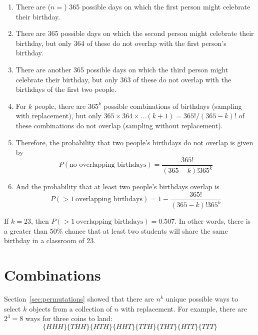 \begin{enumerate}
\item There are ($n=$) 365 possible days on which the first person might
  celebrate their birthday.
\item There are 365 possible days on which the second person might
  celebrate their birthday, but only 364 of these do not overlap with
  the first person's birthday.
\item There are another 365 possible days on which the third person
  might celebrate their birthday, but only 363 of these do not overlap
  with the birthdays of the first two people.
\item For $k$ people, there are $365^k$ possible combinations of
  birthdays (sampling with replacement), but only
  $365\times{364}\times{\ldots}(k+1) = 365!/(365-k)!$ of these combinations
  do not overlap (sampling without replacement).
\item Therefore, the probability that two people's birthdays do
  not overlap is given by
  \[
  P(\mbox{no overlapping birthdays}) = \frac{365!}{(365-k)!365^k}
  \]
\item And the probability that at least two people's birthdays
  overlap is
  \[
  P(>1~\mbox{overlapping birthdays}) = 1 - \frac{365!}{(365-k)!365^k}
  \]  
\end{enumerate}

If $k = 23$, then $P(>1~\mbox{overlapping birthdays}) = 0.507$. In
other words, there is a greater than 50\% chance that at least two
students will share the same birthday in a classroom of 23.

\section{Combinations}
\label{sec:combinations}

Section~\ref{sec:permutations} showed that there are $n^k$ unique
possible ways to select $k$ objects from a collection of $n$ with
replacement. For example, there are $2^3=8$ ways for three coins to
land:
\[\{HHH\}\{THH\}\{HTH\}\{HHT\}\{TTH\}\{THT\}\{HTT\}\{TTT\}\]

